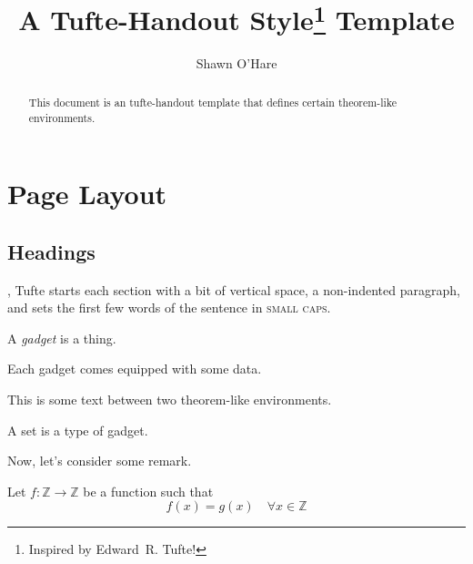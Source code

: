 \documentclass{tufte-handout}
\title{A Tufte-Handout Style\thanks{Inspired by Edward~R. Tufte!} Template}
\author{Shawn O'Hare}
\begin{document}
\maketitle%

\begin{abstract}
\noindent
This document is an tufte-handout template that defines certain theorem-like
environments.
\end{abstract}

\tableofcontents

\section{Page Layout}\label{sec:page-layout}
\subsection{Headings}\label{sec:headings}

,\cite{Tufte2006} Tufte
starts each section with a bit of vertical space, a non-indented paragraph,
and sets the first few words of the sentence in \textsc{small caps}.

\begin{defn}[Gadget]
  A \emph{gadget} is a thing.
  
  Each gadget comes equipped with some data.
\end{defn}

This is some text between two theorem-like environments.

\begin{example}[Gadget]
  A set is a type of gadget.  
\end{example}

\begin{remark}
  Now, let's consider some remark.
\end{remark}

\begin{theorem}
  Let $f \colon \mathbb Z \to \mathbb Z$ be a function such that
  \begin{equation}
    f(x) = g(x) \quad \forall x \in \mathbb Z
  \end{equation}
\end{theorem}




\end{document}
